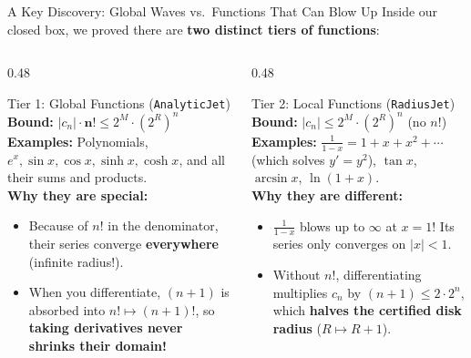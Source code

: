 \documentclass[aspectratio=169,11pt]{beamer}
\begin{document}
\begin{frame}[shrink=6]{A Key Discovery: Global Waves vs.\ Functions That Can Blow Up}
  Inside our closed box, we proved there are \textbf{two distinct tiers of functions}:

  \vspace{0.1cm}
  \begin{columns}[T]
    \begin{column}{0.48\textwidth}
      \begin{block}{Tier 1: Global Functions (\texttt{AnalyticJet})}
        \textbf{Bound:} $|c_n| \cdot \mathbf{n!} \le 2^M \cdot (2^R)^n$\\[3pt]
        \textbf{Examples:} Polynomials, $e^x, \sin x, \cos x, \sinh x, \cosh x$, and all their sums and products.\\[3pt]
        \textbf{Why they are special:}
        \begin{itemize}
          \item Because of $n!$ in the denominator, their series converge \textbf{everywhere} (infinite radius!).
          \item When you differentiate, $(n+1)$ is absorbed into $n! \mapsto (n+1)!$, so \textcolor{okgreen}{\textbf{taking derivatives never shrinks their domain!}}
        \end{itemize}
      \end{block}
    \end{column}
    \begin{column}{0.48\textwidth}
      \begin{block}{Tier 2: Local Functions (\texttt{RadiusJet})}
        \textbf{Bound:} $|c_n| \le 2^M \cdot (2^R)^n$ \quad (\alert{no $n!$})\\[3pt]
        \textbf{Examples:} $\frac{1}{1-x} = 1 + x + x^2 + \cdots$ (which solves $y' = y^2$), $\tan x$, $\arcsin x$, $\ln(1+x)$.\\[3pt]
        \textbf{Why they are different:}
        \begin{itemize}
          \item $\frac{1}{1-x}$ blows up to $\infty$ at $x = 1$! Its series only converges on $|x| < 1$.
          \item Without $n!$, differentiating multiplies $c_n$ by $(n+1) \le 2 \cdot 2^n$, which \textcolor{warnred}{\textbf{halves the certified disk radius}} ($R \mapsto R+1$).
        \end{itemize}
      \end{block}
    \end{column}
  \end{columns}


\end{frame}
\end{document}

